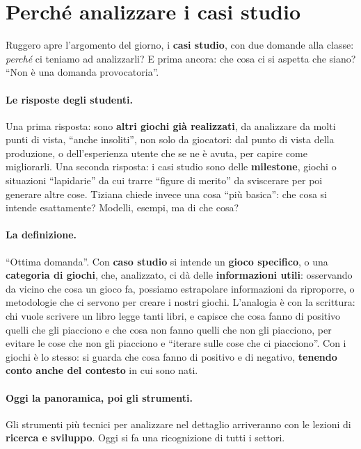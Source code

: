 \section{Perché analizzare i casi studio}
\label{a2:sec:perche}

Ruggero apre l'argomento del giorno, i \textbf{casi studio}, con due domande
alla classe: \emph{perché} ci teniamo ad analizzarli? E prima ancora: che cosa
ci si aspetta che siano? ``Non è una domanda provocatoria''.

\paragraph{Le risposte degli studenti.} Una prima risposta: sono \textbf{altri
giochi già realizzati}, da analizzare da molti punti di vista, ``anche
insoliti'', non solo da giocatori: dal punto di vista della produzione, o
dell'esperienza utente che se ne è avuta, per capire come migliorarli. Una
seconda risposta: i casi studio sono delle \textbf{milestone}, giochi o
situazioni ``lapidarie'' da cui trarre ``figure di merito'' da sviscerare per
poi generare altre cose. Tiziana chiede invece una cosa ``più basica'': che cosa
si intende esattamente? Modelli, esempi, ma di che cosa?

\paragraph{La definizione.} ``Ottima domanda''. Con \textbf{caso studio} si
intende un \textbf{gioco specifico}, o una \textbf{categoria di giochi}, che,
analizzato, ci dà delle \textbf{informazioni utili}: osservando da vicino che
cosa un gioco fa, possiamo estrapolare informazioni da riproporre, o metodologie
che ci servono per creare i nostri giochi. L'analogia è con la scrittura: chi
vuole scrivere un libro legge tanti libri, e capisce che cosa fanno di positivo
quelli che gli piacciono e che cosa non fanno quelli che non gli piacciono, per
evitare le cose che non gli piacciono e ``iterare sulle cose che ci piacciono''.
Con i giochi è lo stesso: si guarda che cosa fanno di positivo e di negativo,
\textbf{tenendo conto anche del contesto} in cui sono nati.

\paragraph{Oggi la panoramica, poi gli strumenti.} Gli strumenti più tecnici
per analizzare nel dettaglio arriveranno con le lezioni di \textbf{ricerca e
sviluppo}. Oggi si fa una ricognizione di tutti i settori.

